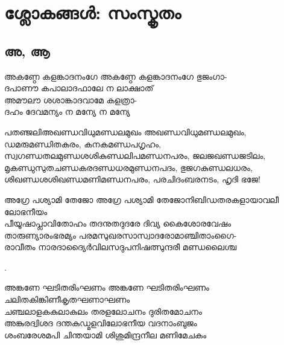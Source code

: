 \section{ശ്ലോകങ്ങൾ: സംസ്കൃതം}
\label{sec:slokams:san}

\subsection{അ, ആ}

\begin{enumerate}

\begin{slokam}{\VBh}{\Sank}{അകണ്ഠേ കളങ്കാദനംഗേ}
അകണ്ഠേ കളങ്കാദനംഗേ ഭുജംഗാ-\\
ദപാണൗ കപാലാദഫാലേ ന ലാക്ഷാത്‌\\
അമൗലൗ ശശാങ്കാദവാമേ കളത്രാ-\\
ദഹം ദേവമന്യം ന മന്യേ ന മന്യേ
\end{slokam}


\begin{slokam}{\VSn}{പതഞ്ജലി}{അഖണ്ഡവിധുമണ്ഡലമുഖം}
അഖണ്ഡവിധുമണ്ഡലമുഖം, ഡമരുമണ്ഡിതകരം, കനകമണ്ഡപഗൃഹം,\\
സ്വഗണ്ഡതലമുണ്ഡശശികുണ്ഡലിപമണ്ഡനപരം, ജലജഖണ്ഡജടിലം,\\
മൃകണ്ഡുസുതചണ്ഡകരദണ്ഡധരമുണ്ഡനപദം, ഭുജഗകുണ്ഡലധരം,\\
ശിഖണ്ഡശശിഖണ്ഡമണിമണ്ഡനപരം, പരചിദംബരനടം, ഹൃദി ഭജേ!
\end{slokam}


\begin{slokam}{\VSr}{\Melp}{അഗ്രേ പശ്യാമി തേജോ}
അഗ്രേ പശ്യാമി തേജോനിബിഡതരകളായാവലീ ലോഭനീയം\\
പീയൂഷാപ്ലാവിതോഹം തദനുതദുദരേ ദിവ്യ കൈശോരവേഷം\\
താരുണ്യാരംഭരമ്യം പരമസുഖരസാസ്വാദരോമാഞ്ചിതാംഗൈ-\\
രാവീതം നാരദാദ്യൈര്‍വിലസദുപനിഷത്സുന്ദരീ മണ്ഡലൈശ്ച
\end{slokam}


.


\begin{slokam}{\VKm}{\LS}{അങ്കണേ ഘടിതരിംഘണം}
അങ്കണേ ഘടിതരിംഘണം ചലിതകിങ്കിണീകൃതഘണാഘണം\\
ചഞ്ചലാളകകുലാകുലം തരളലോചനം ദുരിതമോചനം\\
അങ്കുരദ്വിശദ ദന്തകുഡ്മളവിലോഭനീയ വദനാംബുജം\\
ശംബരേശമപി ചിന്തയാമി ശിശുമിന്ദ്രനീല മണിമേചകം
\end{slokam}


\end{enumerate}

